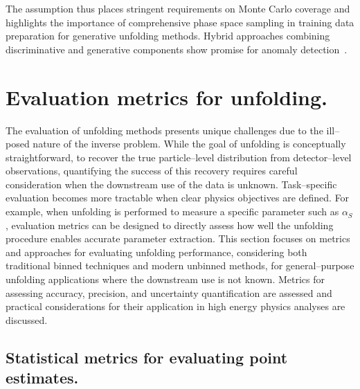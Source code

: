             The assumption thus places stringent requirements on Monte Carlo coverage and highlights the importance of comprehensive phase space sampling in training data preparation for generative unfolding methods.
            Hybrid approaches combining discriminative and generative components show promise for anomaly detection~\cite{DiMattia2019ADetection, Terjek2019AdversarialRegularization}.
\section{Evaluation metrics for unfolding.}
    The evaluation of unfolding methods presents unique challenges due to the ill--posed nature of the inverse problem.
    While the goal of unfolding is conceptually straightforward, to recover the true particle--level distribution from detector--level observations, quantifying the success of this recovery requires careful consideration when the downstream use of the data is unknown.
    Task--specific evaluation becomes more tractable when clear physics objectives are defined.
    For example, when unfolding is performed to measure a specific parameter such as \(\alpha_S\), evaluation metrics can be designed to directly assess how well the unfolding procedure enables accurate parameter extraction.
    This section focuses on metrics and approaches for evaluating unfolding performance, considering both traditional binned techniques and modern unbinned methods, for general--purpose unfolding applications where the downstream use is not known.
    Metrics for assessing accuracy, precision, and uncertainty quantification are assessed and practical considerations for their application in high energy physics analyses are discussed.

    
    \subsection{Statistical metrics for evaluating point estimates.}
